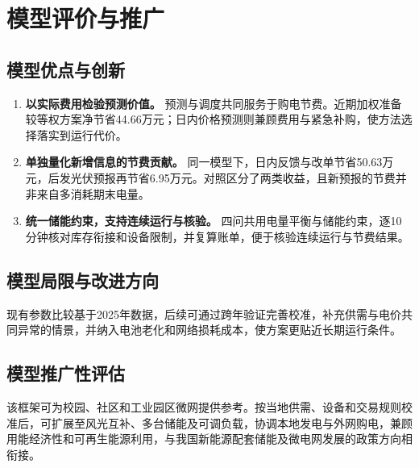 \section{模型评价与推广}

\subsection{模型优点与创新}

\begin{enumerate}
    \item \textbf{以实际费用检验预测价值。}
    预测与调度共同服务于购电节费。近期加权准备较等权方案净节省44.66万元；日内价格预测则兼顾费用与紧急补购，使方法选择落实到运行代价。

    \item \textbf{单独量化新增信息的节费贡献。}
    同一模型下，日内反馈与改单节省50.63万元，后发光伏预报再节省6.95万元。对照区分了两类收益，且新预报的节费并非来自多消耗期末电量。

    \item \textbf{统一储能约束，支持连续运行与核验。}
    四问共用电量平衡与储能约束，逐10分钟核对库存衔接和设备限制，并复算账单，便于核验连续运行与节费结果。
\end{enumerate}

\subsection{模型局限与改进方向}

现有参数比较基于2025年数据，后续可通过跨年验证完善校准，补充供需与电价共同异常的情景，并纳入电池老化和网络损耗成本，使方案更贴近长期运行条件。

\subsection{模型推广性评估}

该框架可为校园、社区和工业园区微网提供参考。按当地供需、设备和交易规则校准后，可扩展至风光互补、多台储能及可调负载，协调本地发电与外网购电，兼顾用能经济性和可再生能源利用，与我国新能源配套储能及微电网发展的政策方向相衔接\cite{carbonplan,energyplan}。
